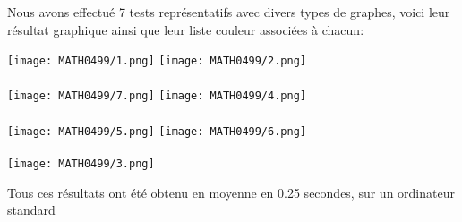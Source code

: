 \documentclass[a4paper, 11pt, oneside]{article}
\begin{document}
Nous avons effectué 7 tests représentatifs avec divers types de graphes,
voici leur résultat graphique ainsi que leur liste couleur associées à chacun:

\texttt{[image: MATH0499/1.png]}
\texttt{[image: MATH0499/2.png]}
\\
\\
\texttt{[image: MATH0499/7.png]}
\texttt{[image: MATH0499/4.png]}
\\
\\
\texttt{[image: MATH0499/5.png]}
\texttt{[image: MATH0499/6.png]}
\\
\\
\texttt{[image: MATH0499/3.png]}

Tous ces résultats ont été obtenu en moyenne en 0.25 secondes, sur un ordinateur standard
\end{document}
